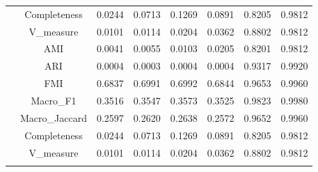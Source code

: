 \begin{table}[ht!]
\begin{tabular*}{\linewidth}{@{} lc c c c c c c @{}}
 & Completeness  & 0.0244 & 0.0713 & 0.1269 & 0.0891 & 0.8205 & 0.9812 \\

 & V_measure  & 0.0101 & 0.0114 & 0.0204 & 0.0362 & 0.8802 & 0.9812 \\
\addlinespace
\multirow{7}{*}{IZGC}
 & AMI  & 0.0041 & 0.0055 & 0.0103 & 0.0205 & 0.8201 & 0.9812 \\

 & ARI  & 0.0004 & 0.0003 & 0.0004 & 0.0004 & 0.9317 & 0.9920 \\

 & FMI  & 0.6837 & 0.6991 & 0.6992 & 0.6844 & 0.9653 & 0.9960 \\

 & Macro_F1  & 0.3516 & 0.3547 & 0.3573 & 0.3525 & 0.9823 & 0.9980 \\

 & Macro_Jaccard  & 0.2597 & 0.2620 & 0.2638 & 0.2572 & 0.9652 & 0.9960 \\

 & Completeness  & 0.0244 & 0.0713 & 0.1269 & 0.0891 & 0.8205 & 0.9812 \\

 & V_measure  & 0.0101 & 0.0114 & 0.0204 & 0.0362 & 0.8802 & 0.9812 \\
\addlinespace
\bottomrule
\end{tabular*}
\end{table}